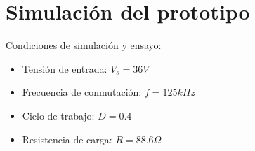 \section{Simulación del prototipo}

Condiciones de simulación y ensayo:

\begin{itemize}
    \item Tensión de entrada: $V_s=36V$
    \item Frecuencia de conmutación: $f=125kHz$
    \item Ciclo de trabajo: $D=0.4$
    \item Resistencia de carga: $R=88.6\Omega$
\end{itemize}
 










